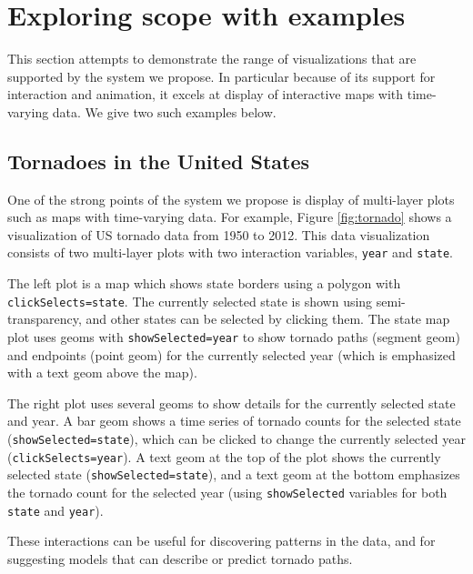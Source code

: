 \documentclass[12pt,]{article}
\theoremstyle{definition}
\theoremstyle{definition}
\theoremstyle{definition}
\theoremstyle{remark}
\begin{document}
\hypertarget{performance}{%
\section{Exploring scope with examples}\label{performance}}

This section attempts to demonstrate the range of visualizations that
are supported by the system we propose. In particular because of its
support for interaction and animation, it excels at display of
interactive maps with time-varying data. We give two such examples
below.

\hypertarget{tornadoes-in-the-united-states}{%
\subsection{Tornadoes in the United
States}\label{tornadoes-in-the-united-states}}

One of the strong points of the system we propose is display of
multi-layer plots such as maps with time-varying data. For example,
Figure \ref{fig:tornado} shows a visualization of US tornado data from
1950 to 2012. This data visualization consists of two multi-layer plots
with two interaction variables, \texttt{year} and \texttt{state}.

The left plot is a map which shows state borders using a polygon with
\texttt{clickSelects=state}. The currently selected state is shown using
semi-transparency, and other states can be selected by clicking them.
The state map plot uses geoms with \texttt{showSelected=year} to show
tornado paths (segment geom) and endpoints (point geom) for the
currently selected year (which is emphasized with a text geom above the
map).

The right plot uses several geoms to show details for the currently
selected state and year. A bar geom shows a time series of tornado
counts for the selected state (\texttt{showSelected=state}), which can
be clicked to change the currently selected year
(\texttt{clickSelects=year}). A text geom at the top of the plot shows
the currently selected state (\texttt{showSelected=state}), and a text
geom at the bottom emphasizes the tornado count for the selected year
(using \texttt{showSelected} variables for both \texttt{state} and
\texttt{year}).

These interactions can be useful for discovering patterns in the data,
and for suggesting models that can describe or predict tornado paths.
\end{document}
